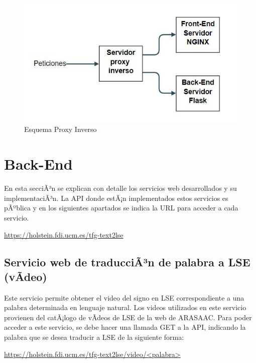 \begin{figure}[]
	\centering
	
	\includegraphics[width=1\textwidth]{Imagenes/Fuentes/Text2LSE/proxy.jpg}
	\caption{Esquema Proxy Inverso}
	\label {fig: imgProxy}
\end{figure}

\section{Back-End}

En esta secciÃ³n se explican con detalle los servicios web desarrollados y su implementaciÃ³n. La API donde estÃ¡n implementados estos servicios es pÃºblica y en los siguientes apartados se indica la URL para acceder a cada servicio.

\begin{shaded}
	\url{https://holstein.fdi.ucm.es/tfg-text2lse }	
\end{shaded}



\subsection{Servicio web de traducciÃ³n de palabra a LSE (vÃ­deo)}

Este servicio permite obtener el video del signo en LSE correspondiente a una palabra determinada en lenguaje natural. Los videos utilizados en este servicio provienen del catÃ¡logo de vÃ­deos de LSE de la web de ARASAAC. Para poder acceder a este servicio, se debe hacer una llamada GET a la API,  indicando la palabra que se desea traducir a LSE de la siguiente forma:\\

\begin{shaded}
	\url{https://holstein.fdi.ucm.es/tfg-text2lse/video/<palabra> }	
\end{shaded}

